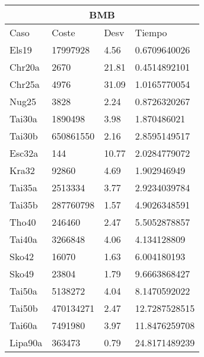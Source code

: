 \documentclass[twoside]{article}
\begin{document}
\begin{table}[h!]
\centering
    \begin{tabular}{llll}
    \hline
    \multicolumn{4}{c}{BMB} \\
    \toprule
    Caso               & Coste & Desv & Tiempo \\
    \midrule
Els19&17997928&4.56&0.6709640026\\
Chr20a&2670&21.81&0.4514892101\\
Chr25a&4976&31.09&1.0165770054\\
Nug25&3828&2.24&0.8726320267\\
Tai30a&1890498&3.98&1.870486021\\
Tai30b&650861550&2.16&2.8595149517\\
Esc32a&144&10.77&2.0284779072\\
Kra32&92860&4.69&1.902946949\\
Tai35a&2513334&3.77&2.9234039784\\
Tai35b&287760798&1.57&4.9026348591\\
Tho40&246460&2.47&5.5052878857\\
Tai40a&3266848&4.06&4.134128809\\
Sko42&16070&1.63&6.004180193\\
Sko49&23804&1.79&9.6663868427\\
Tai50a&5138272&4.04&8.1470592022\\
Tai50b&470134271&2.47&12.7287528515\\
Tai60a&7491980&3.97&11.8476259708\\
Lipa90a&363473&0.79&24.8171489239\\

    \bottomrule
    \end{tabular}
    \caption{}
\end{table}
\end{document}
